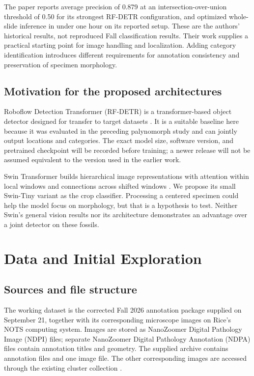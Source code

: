 \documentclass[11pt,letterpaper]{article}
\begin{document}
The paper reports average precision of 0.879 at an intersection-over-union threshold of 0.50 for its strongest RF-DETR configuration, and optimized whole-slide inference in under one hour on its reported setup. These are the authors' historical results, not reproduced Fall classification results. Their work supplies a practical starting point for image handling and localization. Adding category identification introduces different requirements for annotation consistency and preservation of specimen morphology.

\subsection{Motivation for the proposed architectures}
Roboflow Detection Transformer (RF-DETR) is a transformer-based object detector designed for transfer to target datasets \citep{robinson2026}. It is a suitable baseline here because it was evaluated in the preceding palynomorph study and can jointly output locations and categories. The exact model size, software version, and pretrained checkpoint will be recorded before training; a newer release will not be assumed equivalent to the version used in the earlier work.

Swin Transformer builds hierarchical image representations with attention within local windows and connections across shifted windows \citep{liu2021}. We propose its small Swin-Tiny variant as the crop classifier. Processing a centered specimen could help the model focus on morphology, but that is a hypothesis to test. Neither Swin's general vision results nor its architecture demonstrates an advantage over a joint detector on these fossils.

\section{Data and Initial Exploration}
\subsection{Sources and file structure}
The working dataset is the corrected Fall 2026 annotation package supplied on September 21, together with its corresponding microscope images on Rice's NOTS computing system. Images are stored as NanoZoomer Digital Pathology Image (NDPI) files; separate NanoZoomer Digital Pathology Annotation (NDPA) files contain annotation titles and geometry. The supplied archive contains \SlideCount{} annotation files and one image file. The other corresponding images are accessed through the existing cluster collection \citep{inventory2026}.
\end{document}
